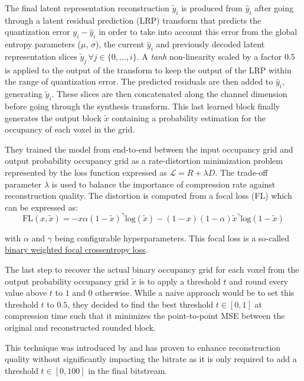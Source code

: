 The final latent representation reconstruction $\tilde{y}_i$ is produced from $\hat{y}_i$ after going through a latent residual prediction (LRP) transform that predicts the quantization error $y_i - \hat{y}_i$ in order to take into account this error from the global entropy parameters ($\mu,\,\sigma$), the current $\hat{y}_i$ and previously decoded latent representation slices $\tilde{y}_j\,\forall j \in \{0,\dots,i\}$. A \textit{tanh} non-linearity scaled by a factor $0.5$ is applied to the output of the transform to keep the output of the LRP within the range of quantization error. 
The predicted residuals are then added to $\hat{y}_i$, generating $\tilde{y}_i$.
These slices are then concatenated along the channel dimension before going through the synthesis transform. This last learned block finally generates the output block $\tilde{x}$ containing a probability estimation for the occupancy of each voxel in the grid.

They trained the model from end-to-end between the input occupancy grid and output probability occupancy grid as a rate-distortion minimization problem represented by the loss function expressed as $\mathcal{L} = R + \lambda D$. The trade-off parameter $\lambda$ is used to balance the importance of compression rate against reconstruction quality. 
The distortion is computed from a focal loss (FL) which can be expressed as: 
$$
\text{FL}(x, \tilde{x}) = -x \alpha (1-\tilde{x})^{\gamma} \text{log}(\tilde{x}) - (1-x) (1-\alpha) \tilde{x}^{\gamma} \text{log}(1-\tilde{x})
$$

\noindent with $\alpha$ and $\gamma$ being configurable hyperparameters. This focal loss is a so-called \href{https://www.tensorflow.org/api_docs/python/tf/keras/losses/BinaryFocalCrossentropy}{binary weighted focal crossentropy loss}.

The last step to recover the actual binary occupancy grid for each voxel from the output probability occupancy grid $\tilde{x}$ is to apply a threshold $t$ and round every value above $t$ to $1$ and $0$ otherwise. While a naive approach would be to set this threshold $t$ to $0.5$, they decided to find the best threshold $t \in [0,1]$ at compression time such that it minimizes the point-to-point MSE \cite{bib:8296925} between the original and reconstructed rounded block.

This technique was introduced by \cite{bib:9287077} and has proven to enhance reconstruction quality without significantly impacting the bitrate as it is only required to add a threshold $t \in [0,100]$ in the final bitstream.
